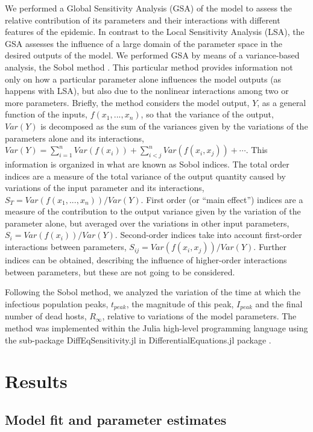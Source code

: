 We performed a Global Sensitivity Analysis (GSA)
\cite{Sensitivity_analysis_book} of the model to assess the relative
contribution of its parameters and their interactions with different features
of the epidemic. In contrast to the Local Sensitivity Analysis (LSA), the GSA
assesses the influence of a large domain of the parameter space in the desired
outputs of the model. We performed GSA by means of a variance-based analysis,
the Sobol method \cite{SOBOL2001271}. This particular method provides
information not only on how a particular parameter alone influences the model
outputs (as happens with LSA), but also due to the nonlinear interactions among
two or more parameters. Briefly, the method considers the model output, $Y$, as
a general function of the inputs, $f(x_1, ..., x_n)$, so that the variance of
the output, $Var(Y)$ is decomposed as the sum of the variances given by the
variations of the parameters alone and its interactions,
$Var(Y)=\sum_{i=1}^nVar(f(x_i)) + \sum_{i<j}^nVar(f(x_i, x_j)) + \cdots$. This
information is organized in what are known as Sobol indices. The total order
indices are a measure of the total variance of the output quantity caused by
variations of the input parameter and its interactions,
$S_T=Var(f(x_1,...,x_n))/Var(Y)$. First order (or ``main effect'') indices are
a measure of the contribution to the output variance given by the variation of
the parameter alone, but averaged over the variations in other input
parameters, $S_i=Var(f(x_i))/Var(Y)$. Second-order indices take into account
first-order interactions between parameters, $S_{ij}=Var(f(x_i,x_j)) / Var(Y)$.
Further indices can be obtained, describing the influence of higher-order
interactions between parameters, but these are not going to be considered.

Following the Sobol method, we analyzed the variation of the time at which
the infectious population peaks, $t_{peak}$, the magnitude of this peak,
$I_{peak}$ and the final number of dead hosts, $R_{\infty}$, relative to
variations of the model parameters. The method was implemented within the Julia
high-level programming language \cite{julia} using the sub-package
DiffEqSensitivity.jl in DifferentialEquations.jl package
\cite{DifferentialEquations.jl}.

\section{Results}

\subsection{Model fit and parameter estimates}

